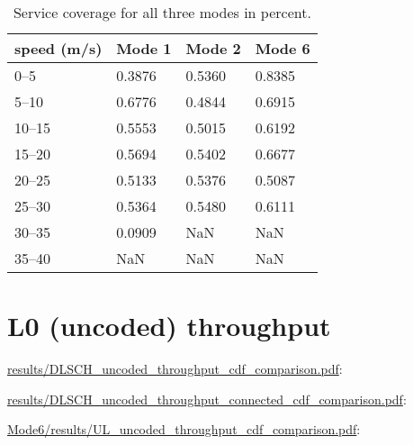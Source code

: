 \documentclass[a4paper,10pt]{article}
\newcommand{\printfile}[2][]{
 \begin{minipage}{8cm}
  \centering
  \url{#2}: #1

 \end{minipage}
}
\begin{document}
\begin{table}
\centering
\begin{tabular}{l|l|l|l}
speed (m/s) & Mode 1 & Mode 2 & Mode 6\\
\hline
0--5   &   0.3876  &  0.5360 &   0.8385\\
5--10  &   0.6776  &  0.4844 &   0.6915\\
10--15 &   0.5553  &  0.5015 &   0.6192\\
15--20 &   0.5694  &  0.5402 &   0.6677\\
20--25 &   0.5133  &  0.5376 &   0.5087\\
25--30 &   0.5364  &  0.5480 &   0.6111\\
30--35 &   0.0909  &     NaN &      NaN\\
35--40 &      NaN  &     NaN &      NaN\\
\end{tabular}
\caption{Service coverage for all three modes in percent.}
\end{table}

\section{L0 (uncoded) throughput}

\printfile{results/DLSCH_uncoded_throughput_cdf_comparison.pdf}
\printfile{results/DLSCH_uncoded_throughput_connected_cdf_comparison.pdf}

\printfile{Mode6/results/UL_uncoded_throughput_cdf_comparison.pdf}
\end{document}
